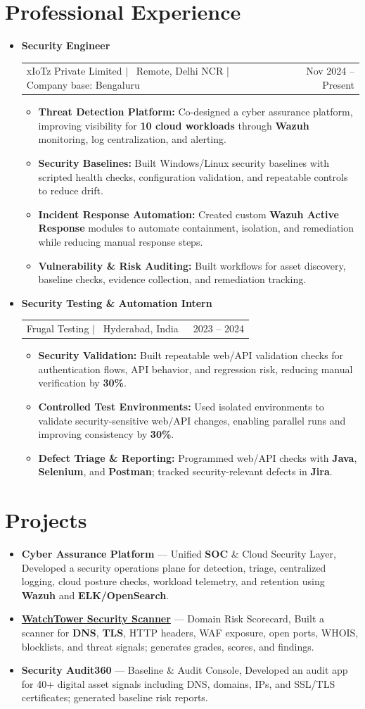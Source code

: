 \documentclass[a4paper,11pt]{article}
\makeatletter
\newcommand{\resumeJobCompact}[4]{%
\item[]
  {\small\textbf{\color{primarycolor}#1}}\\[-1pt]
  \begin{tabular*}{\textwidth}[t]{@{}>{\raggedright\arraybackslash}p{\dimexpr\textwidth - 1.75in\relax}@{\extracolsep{\fill}}r@{}}
    \small #2 $|$ \faMapMarker*\ #4 & \small\color{textgray}\faCalendar*\ #3 \\
  \end{tabular*}\par\vspace{1pt}
}
\newcommand{\resumeExpItem}[1]{
\item {\small #1}}
\newcommand{\resumeExpListStart}{
  \begin{itemize}[
        align=parleft,
        leftmargin=0.12in,
        labelindent=0pt,
        itemindent=0pt,
        label={\small\textbullet},
        labelwidth=0.45em,
        labelsep=0.22em,
        itemsep=2pt,
        topsep=0pt,
        parsep=0pt,
        partopsep=0pt
    ]}
\newcommand{\resumeExpListEnd}{
  \end{itemize}\vspace{-2pt}}
\newcommand{\resumeProjectHeading}[1]{%
\item[]
  {\raggedright\small #1\par}\vspace{1pt}%
}
\newcommand{\resumeSubHeadingListStart}{
\begin{itemize}[leftmargin=0pt, itemindent=0pt, label={}, labelwidth=0pt, labelsep=0pt]}
\newcommand{\resumeSubHeadingListEnd}{
  \end{itemize}}
\makeatother
\begin{document}
  \section{Professional Experience}
  \resumeSubHeadingListStart

  \resumeJobCompact
  {Security Engineer}{xIoTz Private Limited}{Nov 2024 -- Present}{Remote, Delhi NCR | Company base: Bengaluru}
  \resumeExpListStart
  \resumeExpItem{\textbf{Threat Detection Platform:} Co-designed a cyber assurance platform, improving visibility for \textbf{10 cloud workloads} through \textbf{Wazuh} monitoring, log centralization, and alerting.}
  \resumeExpItem{\textbf{Security Baselines:} Built Windows/Linux security baselines with scripted health checks, configuration validation, and repeatable controls to reduce drift.}
  \resumeExpItem{\textbf{Incident Response Automation:} Created custom \textbf{Wazuh Active Response} modules to automate containment, isolation, and remediation while reducing manual response steps.}
  \resumeExpItem{\textbf{Vulnerability \& Risk Auditing:} Built workflows for asset discovery, baseline checks, evidence collection, and remediation tracking.}
  \resumeExpListEnd

  \resumeJobCompact
  {Security Testing \& Automation Intern}{Frugal Testing}{2023 -- 2024}{Hyderabad, India}
  \resumeExpListStart
  \resumeExpItem{\textbf{Security Validation:} Built repeatable web/API validation checks for authentication flows, API behavior, and regression risk, reducing manual verification by \textbf{30\%}.}
  \resumeExpItem{\textbf{Controlled Test Environments:} Used isolated environments to validate security-sensitive web/API changes, enabling parallel runs and improving consistency by \textbf{30\%}.}
  \resumeExpItem{\textbf{Defect Triage \& Reporting:} Programmed web/API checks with \textbf{Java}, \textbf{Selenium}, and \textbf{Postman}; tracked security-relevant defects in \textbf{Jira}.}
  \resumeExpListEnd

  \resumeSubHeadingListEnd

  \section{Projects}
  \resumeSubHeadingListStart
  \resumeProjectHeading
  {\textbf{Cyber Assurance Platform} --- Unified \textbf{SOC} \& Cloud Security Layer, Developed a security operations plane for detection, triage, centralized logging, cloud posture checks, workload telemetry, and retention using \textbf{Wazuh} and \textbf{ELK/OpenSearch}.}
  \resumeProjectHeading
  {\textbf{\href{https://watchtower-web.neerajsec.workers.dev/}{WatchTower Security Scanner}} --- Domain Risk Scorecard, Built a scanner for \textbf{DNS}, \textbf{TLS}, HTTP headers, WAF exposure, open ports, WHOIS, blocklists, and threat signals; generates grades, scores, and findings.}
  \resumeProjectHeading
  {\textbf{Security Audit360} --- Baseline \& Audit Console, Developed an audit app for 40+ digital asset signals including DNS, domains, IPs, and SSL/TLS certificates; generated baseline risk reports.}
  \resumeSubHeadingListEnd
\end{document}
